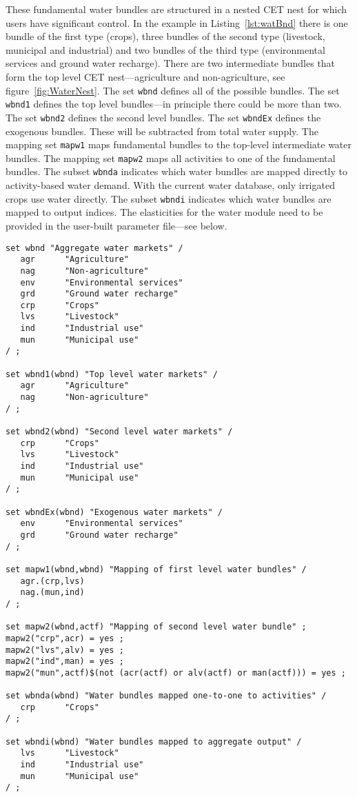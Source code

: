 \noindent These fundamental water bundles are structured in a nested CET nest
for which users have significant control. In the example in
Listing~\ref{lst:watBnd} there is one bundle of the first type (crops), three
bundles of the second type (livestock, municipal and industrial) and two bundles
of the third type (environmental services and ground water recharge). There are
two intermediate bundles that form the top level CET nest---agriculture and
non-agriculture, see figure~\ref{fig:WaterNest}. The set \texttt{wbnd} defines
all of the possible bundles. The set \texttt{wbnd1} defines the top level
bundles---in principle there could be more than two. The set \texttt{wbnd2}
defines the second level bundles. The set \texttt{wbndEx} defines the exogenous
bundles. These will be subtracted from total water supply. The mapping set
\texttt{mapw1} maps fundamental bundles to the top-level intermediate water
bundles. The mapping set \texttt{mapw2} maps all activities to one of the
fundamental bundles. The subset \texttt{wbnda} indicates which water bundles are
mapped directly to activity-based water demand. With the current water database,
only irrigated crops use water directly. The subset \texttt{wbndi} indicates
which water bundles are mapped to output indices. The elasticities for the water
module need to be provided in the user-built parameter file---see below.

\begin{lstlisting}[language=GAMS,
      caption={An example of water configuration}, label=lst:watBnd]
set wbnd "Aggregate water markets" /
   agr      "Agriculture"
   nag      "Non-agriculture"
   env      "Environmental services"
   grd      "Ground water recharge"
   crp      "Crops"
   lvs      "Livestock"
   ind      "Industrial use"
   mun      "Municipal use"
/ ;

set wbnd1(wbnd) "Top level water markets" /
   agr      "Agriculture"
   nag      "Non-agriculture"
/ ;

set wbnd2(wbnd) "Second level water markets" /
   crp      "Crops"
   lvs      "Livestock"
   ind      "Industrial use"
   mun      "Municipal use"
/ ;

set wbndEx(wbnd) "Exogenous water markets" /
   env      "Environmental services"
   grd      "Ground water recharge"
/ ;

set mapw1(wbnd,wbnd) "Mapping of first level water bundles" /
   agr.(crp,lvs)
   nag.(mun,ind)
/ ;

set mapw2(wbnd,actf) "Mapping of second level water bundle" ;
mapw2("crp",acr) = yes ;
mapw2("lvs",alv) = yes ;
mapw2("ind",man) = yes ;
mapw2("mun",actf)$(not (acr(actf) or alv(actf) or man(actf))) = yes ;

set wbnda(wbnd) "Water bundles mapped one-to-one to activities" /
   crp      "Crops"
/ ;

set wbndi(wbnd) "Water bundles mapped to aggregate output" /
   lvs      "Livestock"
   ind      "Industrial use"
   mun      "Municipal use"
/ ;
\end{lstlisting}


